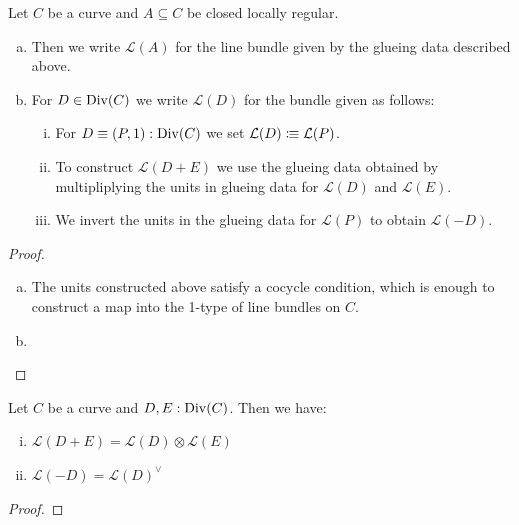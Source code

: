 \begin{definition}
  Let \(C\) be a curve and \(A\subseteq C\) be closed locally regular.
  \begin{enumerate}[(a)]
  \item Then we write \(\mathcal L(A)\) for the line bundle given by the glueing data described above.
  \item For \(D\in\mathrm{Div}(C)\) we write \(\mathcal L(D)\) for the bundle given as follows:
  \begin{enumerate}[(i)]
  \item For \(D\equiv (P,1):\mathrm{Div}(C)\) we set \(\mathcal L(D)\vcentcolon\mspace{-1.2mu}\equiv \mathcal L(P)\).
  \item To construct \(\mathcal L(D+E)\) we use the glueing data obtained by multipliplying the units in glueing data for \(\mathcal L(D)\) and \(\mathcal L(E)\).
  \item We invert the units in the glueing data for \(\mathcal L(P)\) to obtain \(\mathcal L(-D)\).
  \end{enumerate}
  \end{enumerate}
\end{definition}

\begin{proof}
\begin{enumerate}[(a)]
\item The units constructed above satisfy a cocycle condition, which is enough to construct a map into the 1-type of line bundles on \(C\).
\item {}
\end{enumerate}
\end{proof}

\begin{lemma}
  Let \(C\) be a curve and \(D,E:\mathrm{Div}(C)\). Then we have:
  \begin{enumerate}[(i)]
  \item \(\mathcal L(D+E)=\mathcal L(D)\otimes\mathcal L(E)\)
  \item \(\mathcal L(-D)=\mathcal L(D)^\vee\)
  \end{enumerate}
\end{lemma}

\begin{proof}
\end{proof}
